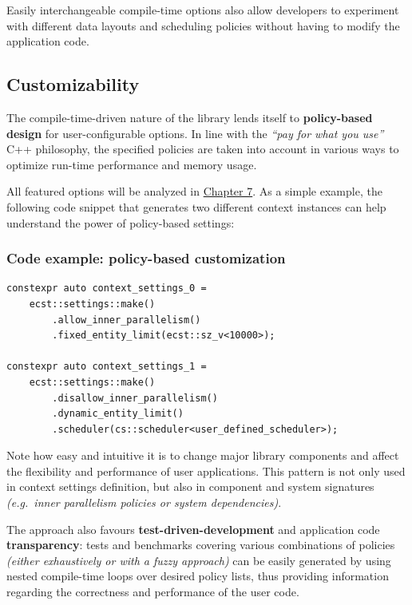 \documentclass[oneside, 12pt, a4paper, openany]{book}
\begin{document}
Easily interchangeable compile-time options also allow developers to
experiment with different data layouts and scheduling policies without
having to modify the application code.

\subsection{Customizability}\label{customizability}

The compile-time-driven nature of the library lends itself to
\textbf{policy-based design} for user-configurable options. In line with
the \emph{``pay for what you use''} C++ philosophy, the specified
policies are taken into account in various ways to optimize run-time
performance and memory usage.

All featured options will be analyzed in
\protect\hyperlink{chap_ecst_compiletime}{Chapter 7}. As a simple
example, the following code snippet that generates two different context
instances can help understand the power of policy-based settings:

\subsubsection{Code example: policy-based
customization}\label{code-example-policy-based-customization}

\begin{verbatim}
constexpr auto context_settings_0 =
    ecst::settings::make()
        .allow_inner_parallelism()
        .fixed_entity_limit(ecst::sz_v<10000>);

constexpr auto context_settings_1 =
    ecst::settings::make()
        .disallow_inner_parallelism()
        .dynamic_entity_limit()
        .scheduler(cs::scheduler<user_defined_scheduler>);
\end{verbatim}

Note how easy and intuitive it is to change major library components and
affect the flexibility and performance of user applications. This
pattern is not only used in context settings definition, but also in
component and system signatures \emph{(e.g.~inner parallelism policies
or system dependencies)}.

The approach also favours \textbf{test-driven-development} and
application code \textbf{transparency}: tests and benchmarks covering
various combinations of policies \emph{(either exhaustively or with a
fuzzy approach)} can be easily generated by using nested compile-time
loops over desired policy lists, thus providing information regarding
the correctness and performance of the user code.
\end{document}
